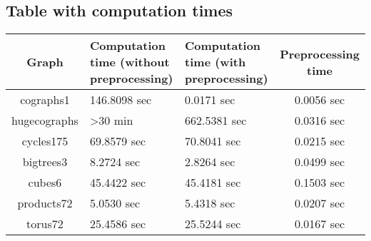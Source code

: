 \documentclass[twoside]{article}
\theoremstyle{definition}
\theoremstyle{plain}
\begin{document}
\begin{appendices}
\section{Table with computation times}
\begin{tabular}{c|C{0.3\textwidth}|C{0.3\textwidth}|c}
Graph & Computation time (without preprocessing) & Computation time (with preprocessing) & Preprocessing time \\
\hline
cographs1 & 146.8098 sec & 0.0171 sec & 0.0056 sec \\
hugecographs & >30 min & 662.5381 sec & 0.0316 sec \\
cycles175 & 69.8579 sec & 70.8041 sec & 0.0215 sec\\
bigtrees3 & 8.2724 sec & 2.8264 sec & 0.0499 sec\\
cubes6 & 45.4422 sec & 45.4181 sec & 0.1503 sec\\
products72 & 5.0530 sec & 5.4318 sec & 0.0207 sec\\
torus72 & 25.4586 sec & 25.5244 sec & 0.0167 sec\\
\end{tabular}
\end{appendices}
\end{document}
